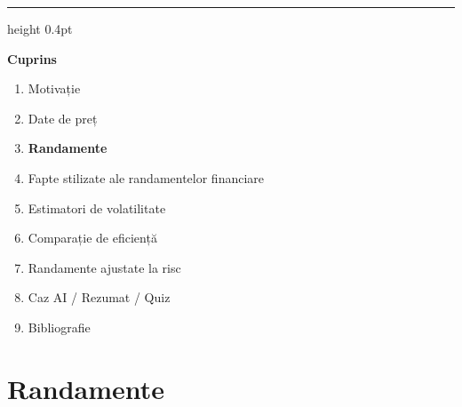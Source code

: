 \documentclass[9pt, aspectratio=169, t]{beamer}
\theoremstyle{definition}
\begin{document}
{
\begin{frame}{}
    {\color{FooterGray}\hrule height 0.4pt}
    \vspace{0.1cm}
    {\Large\textcolor{IDAred}{\textbf{Cuprins}}}
    \vspace{0.2cm}
    \begin{enumerate}
        \item Motivație \checkmark
        \item Date de preț \checkmark
        \item \textbf{Randamente}
        \item Fapte stilizate ale randamentelor financiare
        \item Estimatori de volatilitate
        \item Comparație de eficiență
        \item Randamente ajustate la risc
        \item Caz AI / Rezumat / Quiz
        \item Bibliografie
    \end{enumerate}
\end{frame}
}

\section{Randamente}
\end{document}
